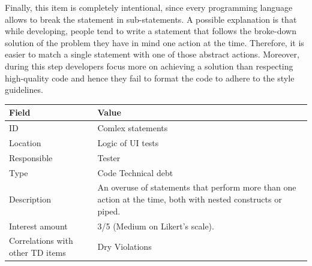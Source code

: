     Finally, this item is completely intentional, since every programming language allows to break the statement in sub-statements. A possible explanation is that while developing, people tend to write a statement that follows the broke-down solution of the problem they have in mind one action at the time. Therefore, it is easier to match a single statement with one of those abstract actions. Moreover, during this step developers focus more on achieving a solution than respecting high-quality code and hence they fail to format the code to adhere to the style guidelines.



	\begin{table}[!htbp]
		\centering
		\tabulinesep=1.2mm
		\begin{tabu} to \textwidth {|X|X[3]|}

			\hline
			\textbf{Field} & \textbf{Value} \\
			\hline

			ID & Comlex statements \\
			\hline

			Location & Logic of UI tests \\
			\hline

			Responsible & Tester \\
			\hline

			Type & Code Technical debt \\
			\hline

			Description & An overuse of statements that perform more than one action at the time, both with nested constructs or piped. \\
			\hline



			Interest amount &  3/5 (Medium on Likert's scale). \\
			\hline



			Correlations with other TD items & Dry Violations\\
			\hline



\end{tabu}
\end{table}

